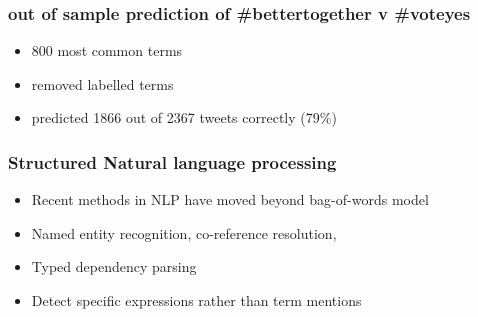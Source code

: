 \documentclass[11pt, table, dvipsnames]{beamer}
\begin{document}

\begin{frame}
\frametitle{out of sample prediction of \#bettertogether v \#voteyes}
  \begin{itemize}
  \item 800 most common terms
  \item removed labelled terms
  \item predicted 1866 out of 2367 tweets correctly (79\%)
  \end{itemize}
\end{frame}


\begin{frame}
  \frametitle{Structured Natural language processing}
  \begin{itemize}
  \item Recent methods in NLP have moved beyond bag-of-words model
  \item Named entity recognition, co-reference resolution, 
  \item Typed dependency parsing
  \item Detect specific expressions rather than term mentions
  \end{itemize}
\end{frame}
\end{document}
